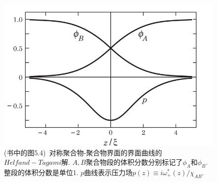 \begin{figure}[htbp]
    \centering
    \centerline{\includegraphics[scale=0.4]{./Contents/chapter5/figures/fig4.png}}
    \caption{(书中的图5.4)\
    对称聚合物-聚合物界面的界面曲线的$Helfand-Tagami$解. $A,
    B$聚合物段的体积分数分别标记了$\phi_{A}$和$\phi_{B}$.
    整段的体积分数是单位1. $p$曲线表示压力场$p(z)\equiv
    i\omega^{*}_{+}(z)/\chi_{AB}$.}
	\label{fig.1}
\end{figure}





